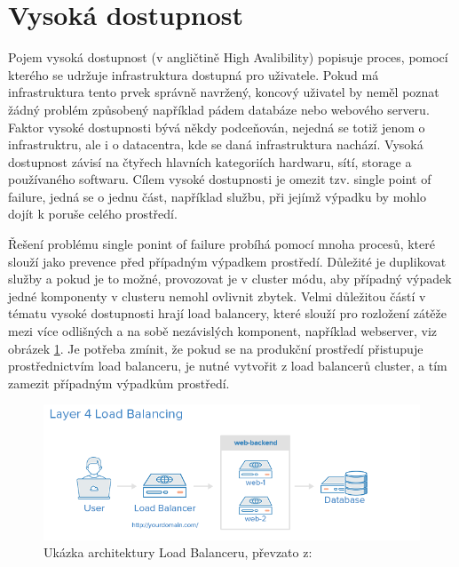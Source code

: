 \section{Vysoká dostupnost} \label{par:ha}
Pojem vysoká dostupnost (v angličtině High Avalibility) popisuje proces, pomocí kterého se udržuje infrastruktura dostupná pro uživatele. Pokud má infrastruktura tento prvek správně navržený, koncový uživatel by neměl poznat žádný problém způsobený například pádem databáze nebo webového serveru. Faktor vysoké dostupnosti bývá někdy podceňován, nejedná se totiž jenom o infrastruktru, ale i o datacentra, kde se daná infrastruktura nachází. Vysoká dostupnost závisí na čtyřech hlavních kategoriích hardwaru, sítí, storage a používaného softwaru. Cílem vysoké dostupnosti je omezit tzv. single point of failure, jedná se o jednu část, například službu, při jejímž výpadku by mohlo dojít k poruše celého prostředí.

Řešení problému single ponint of failure probíhá pomocí mnoha procesů, které slouží jako prevence před případným výpadkem prostředí. Důležité je duplikovat služby a pokud je to možné, provozovat je v cluster módu, aby případný výpadek jedné komponenty v clusteru nemohl ovlivnit zbytek. Velmi důležitou částí v tématu vysoké dostupnosti hrají load balancery, které slouží pro rozložení zátěže mezi více odlišných a na sobě nezávislých komponent, například webserver, viz obrázek \ref{fig:load_balancing}. Je potřeba zmínit, že pokud se na produkční prostředí přistupuje prostřednictvím load balanceru, je nutné vytvořit z load balancerů cluster, a tím zamezit případným výpadkům prostředí.

\begin{figure}[H]
\begin{centering}
\includegraphics[width=1\textwidth]{img/load_balancing}
\par\end{centering}
\caption{Ukázka architektury Load Balanceru, převzato z: \cite{lb_ha} \label{fig:load_balancing}}
\end{figure}

